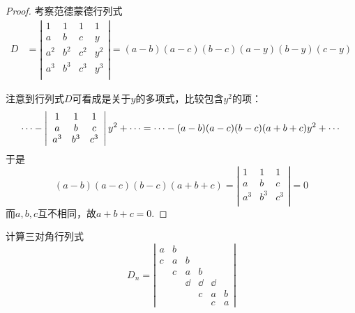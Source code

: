 \begin{frame}
\begin{proof}
  考察范德蒙德行列式
  $$
  \begin{array}{ll}
    D & = \left|
        \begin{array}{cccc}
          1   &   1   &   1   & 1\\
          a   &   b   &   c   & y\\
          a^2 &   b^2 &   c^2 & y^2\\
          a^3 &   b^3 &   c^3 & y^3\\
        \end{array}
    \right|
    = (a-b)(a-c)(b-c)(a-y)(b-y)(c-y) 
  \end{array}
  $$
  
  注意到行列式$D$可看成是关于$y$的多项式，比较包含$y^2$的项：
  $$
  \cdots - \left|
    \begin{array}{cccc}
      1   &   1   &   1  \\ 
      a   &   b   &   c  \\
      a^3 &   b^3 &   c^3\\
    \end{array}
  \right| y^2 + \cdots = 
  \cdots -(a-b)(a-c)(b-c)(a+b+c)y^2 + \cdots 
  $$
  于是
  $$
  (a-b)(a-c)(b-c)(a+b+c) = \left|
    \begin{array}{cccc}
      1   &   1   &   1  \\ 
      a   &   b   &   c  \\
      a^3 &   b^3 &   c^3\\
    \end{array}
  \right|
  = 0
  $$
  而$a,b,c$互不相同，故$a+b+c=0$.
\end{proof}
%
\end{frame}

\begin{frame}
\begin{testexample}
  计算三对角行列式
  $$
  D_n = \left|
    \begin{array}{cccccc}
      a & b & &&&\\
      c&a&b&&&\\
        &c&a&b&&\\
        &&\dd&\dd&\dd&\\
        &&&c&a&b\\
        &&&&c&a
    \end{array}
  \right|
  $$
\end{testexample}
\end{frame}

